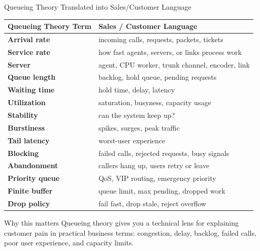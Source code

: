 \documentclass[aspectratio=169]{beamer}
\begin{document}
\begin{frame}{Queueing Theory Translated into Sales/Customer Language}
\scriptsize

\begin{tabular}{p{3.0cm} p{7.8cm}}
\toprule
\textbf{Queueing Theory Term} & \textbf{Sales / Customer Language} \\
\midrule
\textbf{Arrival rate} & incoming calls, requests, packets, tickets \\
\textbf{Service rate} & how fast agents, servers, or links process work \\
\textbf{Server} & agent, CPU worker, trunk channel, encoder, link \\
\textbf{Queue length} & backlog, hold queue, pending requests \\
\textbf{Waiting time} & hold time, delay, latency \\
\textbf{Utilization} & saturation, busyness, capacity usage \\
\textbf{Stability} & can the system keep up? \\
\textbf{Burstiness} & spikes, surges, peak traffic \\
\textbf{Tail latency} & worst-user experience \\
\textbf{Blocking} & failed calls, rejected requests, busy signals \\
\textbf{Abandonment} & callers hang up, users retry or leave \\
\textbf{Priority queue} & QoS, VIP routing, emergency priority \\
\textbf{Finite buffer} & queue limit, max pending, dropped work \\
\textbf{Drop policy} & fail fast, drop stale, reject overflow \\
\bottomrule
\end{tabular}

\vspace{0.15cm}

\begin{alertblock}{Why this matters}
Queueing theory gives you a technical lens for explaining customer pain in practical business terms: congestion, delay, backlog, failed calls, poor user experience, and capacity limits.
\end{alertblock}

\end{frame}
\end{document}
